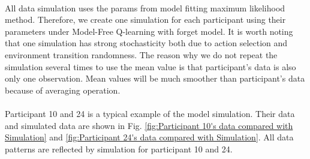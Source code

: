 \paragraph{}
All data simulation uses the params from model fitting maximum likelihood method. Therefore, we create one simulation for each participant using their parameters under Model-Free Q-learning with forget model. It is worth noting that one simulation has strong stochasticity both due to action selection and environment transition randomness. The reason why we do not repeat the simulation several times to use the mean value is that participant's data is also only one observation. Mean values will be much smoother than participant's data because of averaging operation. 

\paragraph{}
Participant 10 and 24 is a typical example of the model simulation. Their data and simulated data are shown in Fig. \ref{fig:Participant 10's data compared with Simulation} and \ref{fig:Participant 24's data compared with Simulation}. All data patterns are reflected by simulation for participant 10 and 24. 


